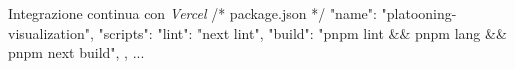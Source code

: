 \begin{tsCode}{Integrazione continua con \textit{Vercel}}
/* package.json */
{
  "name": "platooning-visualization",
  "scripts": {
    "lint": "next lint",
    "build": "pnpm lint && pnpm lang && pnpm next build",
  }, ...
}
\end{tsCode}